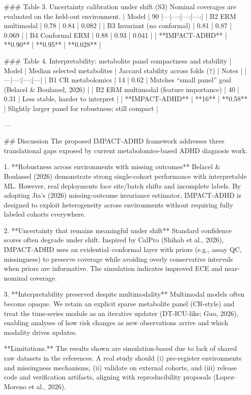 ### Table 3. Uncertainty calibration under shift (S3)  
Nominal coverages are evaluated on the held-out environment.  
| Model | 90%
|---|---:|---:|---:|
| B2 ERM multimodal | 0.78 | 0.84 | 0.082 |
| B3 Invariant (no conformal) | 0.81 | 0.87 | 0.069 |
| B4 Conformal ERM | 0.88 | 0.93 | 0.041 |
| **IMPACT-ADHD** | **0.90** | **0.95** | **0.028** |

### Table 4. Interpretability: metabolite panel compactness and stability  
| Model | Median selected metabolites | Jaccard stability across folds (↑) | Notes |
|---|---:|---:|---|
| B1 CR metabolomics | 14 | 0.62 | Matches “small panel” goal (Belacel & Boulassel, 2026) |
| B2 ERM multimodal (feature importance) | 40 | 0.31 | Less stable, harder to interpret |
| **IMPACT-ADHD** | **16** | **0.58** | Slightly larger panel for robustness; still compact |

---

## Discussion  
The proposed IMPACT-ADHD framework addresses three translational gaps exposed by current metabolomics-based ADHD diagnosis work.

1. **Robustness across environments with missing outcomes**  
   Belacel & Boulassel (2026) demonstrate strong single-cohort performance with interpretable ML. However, real deployments face site/batch shifts and incomplete labels. By adopting Jia’s (2026) missing-outcome invariance estimator, IMPACT-ADHD is designed to exploit heterogeneity across environments without requiring fully labeled cohorts everywhere.

2. **Uncertainty that remains meaningful under shift**  
   Standard confidence scores often degrade under shift. Inspired by CalPro (Shihab et al., 2026), IMPACT-ADHD uses an evidential–conformal layer with priors (e.g., assay QC, missingness) to preserve coverage while avoiding overly conservative intervals when priors are informative. The simulation indicates improved ECE and near-nominal coverage.

3. **Interpretability preserved despite multimodality**  
   Multimodal models often become opaque. We retain an explicit sparse metabolite panel (CR-style) and treat the time-series module as an iterative updater (DT-ICU-like; Guo, 2026), enabling analyses of how risk changes as new observations arrive and which modality drives updates.

**Limitations.** The results shown are simulation-based due to lack of shared raw datasets in the references. A real study should (i) pre-register environments and missingness mechanisms, (ii) validate on external cohorts, and (iii) release code and verification artifacts, aligning with reproducibility proposals (Lopez-Moreno et al., 2026).

